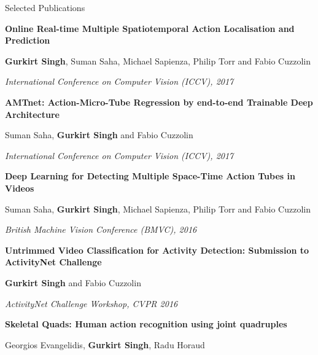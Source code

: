 \documentclass{resume} %
\begin{document}
\begin{rSection}{Selected Publications}
{%
\vspace{-0.04in}
\textbf{Online Real-time Multiple Spatiotemporal Action Localisation and Prediction}

\vspace{-0.1in}
\small{\textbf{Gurkirt Singh}, Suman Saha, Michael Sapienza, Philip Torr and Fabio Cuzzolin}

\vspace{-0.1in}
\textit{\small{International Conference on Computer Vision (ICCV), 2017}}


\vspace{-0.04in}
\textbf{AMTnet: Action-Micro-Tube Regression by end-to-end Trainable Deep Architecture}

\vspace{-0.1in}
\small{Suman Saha, \textbf{Gurkirt Singh} and Fabio Cuzzolin}

\vspace{-0.1in}
\textit{\small{International Conference on Computer Vision (ICCV), 2017}}


\vspace{-0.04in}
\textbf{Deep Learning for Detecting Multiple Space-Time Action Tubes in Videos}

\vspace{-0.1in}
\small{Suman Saha, \textbf{Gurkirt Singh}, Michael Sapienza, Philip Torr and Fabio Cuzzolin}

\vspace{-0.1in}
\textit{\small{British Machine Vision Conference (BMVC), 2016}}

\vspace{-0.04in}
\textbf{Untrimmed Video Classification for Activity Detection: Submission to ActivityNet Challenge}

\vspace{-0.1in}
\small{\textbf{Gurkirt Singh} and Fabio Cuzzolin}

\vspace{-0.1in}
\textit{\small{ActivityNet Challenge Workshop, CVPR 2016}}


\vspace{-0.04in}
\textbf{Skeletal Quads: Human action recognition using joint quadruples}

\vspace{-0.1in}
\small{Georgios Evangelidis, \textbf{Gurkirt Singh}, Radu Horaud}

}
\end{rSection}
\end{document}
